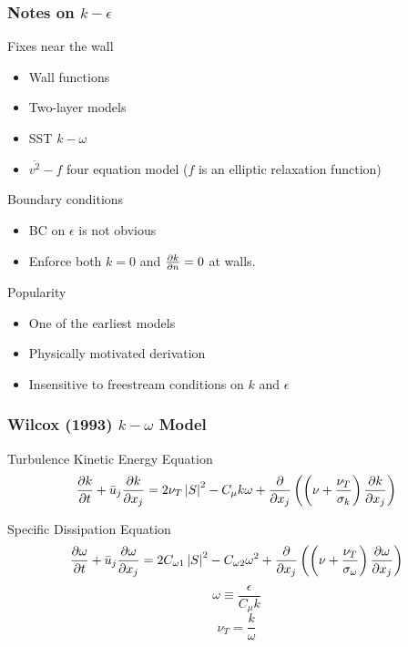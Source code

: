 \documentclass{beamer}
\begin{document}
\begin{frame}\frametitle{Notes on $k-\epsilon$}
\begin{block}{Fixes near the wall}
\begin{itemize}
	\item Wall functions
	\item Two-layer models
	\item SST $k-\omega$
	\item $\overline{v^2}-f$ four equation model ($f$ is an elliptic relaxation function)
\end{itemize}
\end{block}
\begin{block}{Boundary conditions}
\begin{itemize}
	\item BC on $\epsilon$ is not obvious
	\item Enforce both $k=0$ and $\pd{k}{n}=0$ at walls.
\end{itemize}
\end{block}
\begin{block}{Popularity}
\begin{itemize}
	\item One of the earliest models
	\item Physically motivated derivation
	\item Insensitive to freestream conditions on $k$ and $\epsilon$
\end{itemize}
\end{block}
\end{frame}

\begin{frame}\frametitle{Wilcox (1993) $k-\omega$ Model }
\begin{block}{Turbulence Kinetic Energy Equation}
\[
\pd{k}{t}+\bar u_j\pd{k}{x_j}=2\nu_T\snorm{S}^2-C_\mu k\omega
+\pd{}{x_j}\LRp{\LRp{\nu+\frac{\nu_T}{\sigma_k}}\pd{k}{x_j}}
\]
\end{block}
\begin{block}{Specific Dissipation Equation}
\[
\pd{\omega}{t}+\bar u_j\pd{\omega}{x_j}=2C_{\omega1}\snorm{S}^2-C_{\omega2}\omega^2
+\pd{}{x_j}\LRp{\LRp{\nu+\frac{\nu_T}{\sigma_\omega}}\pd{\omega}{x_j}}
\]
\[
\omega\equiv\frac{\epsilon}{C_\mu k}
\]
\[
\nu_T=\frac{k}{\omega}
\]
\end{block}
\end{frame}
\end{document}
